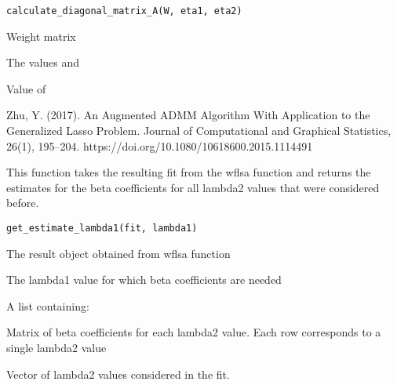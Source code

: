 \documentclass[a4paper]{book}
\begin{document}
%
\begin{Usage}
\begin{verbatim}
calculate_diagonal_matrix_A(W, eta1, eta2)
\end{verbatim}
\end{Usage}
%
\begin{Arguments}
\begin{ldescription}
\item[\code{W}] Weight matrix 

\item[\code{eta1, eta2}] The values  and 
\end{ldescription}
\end{Arguments}
%
\begin{Value}
Value of 
\end{Value}
%
\begin{References}\relax
Zhu, Y. (2017). An Augmented ADMM Algorithm With Application to the 
Generalized Lasso Problem. Journal of Computational and Graphical Statistics, 
26(1), 195–204. https://doi.org/10.1080/10618600.2015.1114491
\end{References}
%
\begin{Description}\relax
This function takes the resulting fit from the wflsa function and returns the
estimates for the beta coefficients for all lambda2 values that were considered
before.
\end{Description}
%
\begin{Usage}
\begin{verbatim}
get_estimate_lambda1(fit, lambda1)
\end{verbatim}
\end{Usage}
%
\begin{Arguments}
\begin{ldescription}
\item[\code{fit}] The result object obtained from wflsa function

\item[\code{lambda1}] The lambda1 value for which beta coefficients are needed
\end{ldescription}
\end{Arguments}
%
\begin{Value}
A list containing:
\begin{ldescription}
\item[\code{betas}] Matrix of beta coefficients for each lambda2 value. Each row corresponds to a single lambda2 value
\item[\code{lambda2}] Vector of lambda2 values considered in the fit.
\end{ldescription}
\end{Value}
\end{document}
